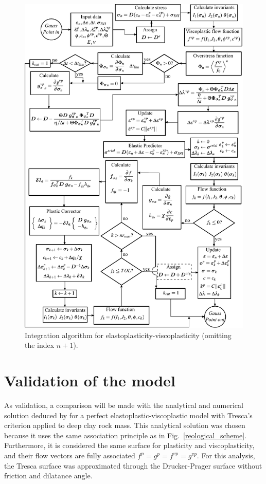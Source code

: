 \documentclass[Journal,letterpaper]{ascelike-new}
\begin{document}
\begin{figure}
	\centering
	\includegraphics[scale = 1.0]{FIG3.pdf}
	\caption{\label{integração EPVP}Integration algorithm for elastoplasticity-viscoplasticity (omitting the index $n+1$).}
\end{figure}

\section{Validation of the model}

As validation, a comparison will be made with the analytical and numerical solution deduced by \cite{piepi1995} for a perfect elastoplastic-viscoplastic model with Tresca’s criterion applied to deep clay rock mass. This analytical solution was chosen because it uses the same association principle as in Fig.~\ref{reological_scheme}. Furthermore, it is considered the same surface for plasticity and viscoplasticity, and their flow vectors are fully associated  $f^p = g^{p} = f^{vp} = g^{vp}$. For this analysis, the Tresca surface was approximated through the Drucker-Prager surface without friction and dilatance angle.
\end{document}
